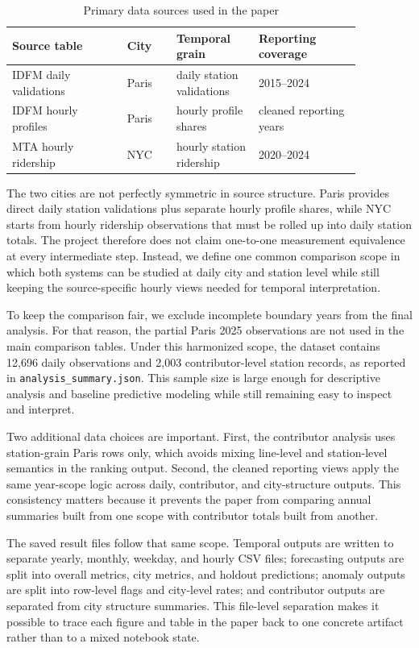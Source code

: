 \documentclass[10pt,twocolumn,a4paper]{article}
\begin{document}
\begin{table}[t]
\centering
\scriptsize
\caption{Primary data sources used in the paper}
{\setlength{\tabcolsep}{3pt}
\begin{tabular}{@{}L{0.29\linewidth}L{0.12\linewidth}L{0.20\linewidth}L{0.25\linewidth}@{}}
\toprule
Source table & City & Temporal grain & Reporting coverage \\
\midrule
IDFM daily validations & Paris & daily station validations & 2015--2024 \\
IDFM hourly profiles & Paris & hourly profile shares & cleaned reporting years \\
MTA hourly ridership & NYC & hourly station ridership & 2020--2024 \\
\bottomrule
\end{tabular}
}
\end{table}

The two cities are not perfectly symmetric in source structure. Paris provides
direct daily station validations plus separate hourly profile shares, while NYC
starts from hourly ridership observations that must be rolled up into daily
station totals. The project therefore does not claim one-to-one measurement
equivalence at every intermediate step. Instead, we define one common
comparison scope in which both systems can be studied at daily city and station
level while still keeping the source-specific hourly views needed for temporal
interpretation.

To keep the comparison fair, we exclude incomplete boundary years from the
final analysis. For that reason, the partial Paris 2025 observations are not
used in the main comparison tables. Under this harmonized scope, the dataset
contains 12,696 daily observations and 2,003 contributor-level station
records, as reported in \nolinkurl{analysis_summary.json}. This sample size is
large enough for descriptive analysis and baseline predictive modeling while
still remaining easy to inspect and interpret.

Two additional data choices are important. First, the contributor
analysis uses station-grain Paris rows only, which avoids mixing line-level and
station-level semantics in the ranking output. Second, the cleaned reporting
views apply the same year-scope logic across daily, contributor, and
city-structure outputs. This consistency matters because it prevents the paper
from comparing annual summaries built from one scope with contributor totals
built from another.

The saved result files follow that same scope. Temporal outputs are written to
separate yearly, monthly, weekday, and hourly CSV files;
forecasting outputs are split into overall metrics, city metrics, and holdout
predictions; anomaly outputs are split into row-level flags and city-level
rates; and contributor outputs are separated from city structure summaries. This
file-level separation makes it possible to trace each figure and table in the
paper back to one concrete artifact rather than to a mixed notebook state.
\end{document}
